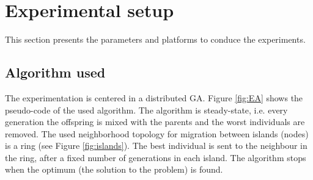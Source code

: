 \documentclass[final,1p,times]{elsarticle}
\begin{document}


\section{Experimental setup}
\label{sec:experiments}
This section presents the parameters and platforms to conduce the experiments. 



\subsection{Algorithm used}
The experimentation is centered in a distributed GA. Figure \ref{fig:EA} shows the pseudo-code of the used algorithm. %
The algorithm is steady-state, i.e. every generation the offspring is mixed with the parents and the worst individuals are removed. The used neighborhood topology for migration between islands (nodes) is a ring (see Figure \ref{fig:islands}). The best individual is sent to the neighbour in the ring, after a fixed number of generations in each island. The algorithm stops when the optimum (the solution to the problem) is found.  %
\end{document}
